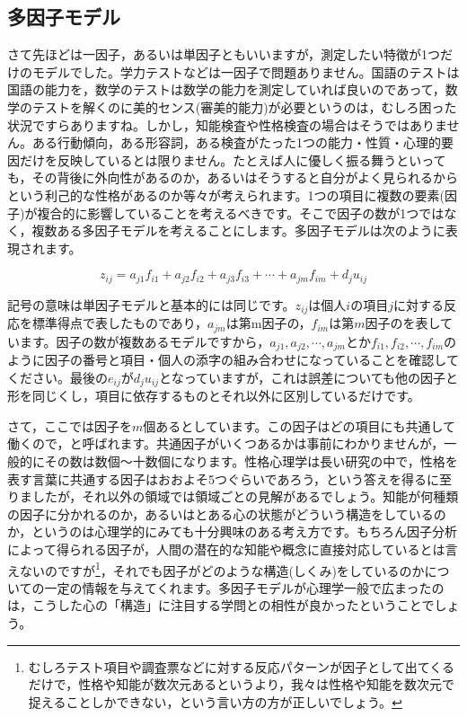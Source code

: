 \documentclass{ltjsbook}
\begin{document}
\subsection{多因子モデル}
さて先ほどは一因子，あるいは単因子ともいいますが，測定したい特徴が1つだけのモデルでした。学力テストなどは一因子で問題ありません。国語のテストは国語の能力を，数学のテストは数学の能力を測定していれば良いのであって，数学のテストを解くのに美的センス(審美的能力)が必要というのは，むしろ困った状況ですらありますね。しかし，知能検査や性格検査の場合はそうではありません。ある行動傾向，ある形容詞，ある検査がたった1つの能力・性質・心理的要因だけを反映しているとは限りません。たとえば人に優しく振る舞うといっても，その背後に外向性があるのか，あるいはそうすると自分がよく見られるからという利己的な性格があるのか等々が考えられます。1つの項目に複数の要素(因子)が複合的に影響していることを考えるべきです。そこで因子の数が1つではなく，複数ある多因子モデルを考えることにします。多因子モデルは次のように表現されます。

\begin{equation}
	z_{ij} = a_{j1}f_{i1} + a_{j2}f_{i2}+a_{j3}f_{i3} + \cdots + a_{jm}f_{im} + d_j u_{ij}
	\label{factor}
\end{equation}

記号の意味は単因子モデルと基本的には同じです。$z_{ij}$は個人$i$の項目$j$に対する反応を標準得点で表したものであり，$a_{jm}$は第m因子の，$f_{im}$は第$m$因子のを表しています。因子の数が複数あるモデルですから，$a_{j1},a_{j2},\cdots, a_{jm}$とか$f_{i1},f_{i2},\cdots, f_{im}$のように因子の番号と項目・個人の添字の組み合わせになっていることを確認してください。最後の$e_{ij}$が$d_j u_{ij}$となっていますが，これは誤差についても他の因子と形を同じくし，項目に依存するものとそれ以外に区別しているだけです。

さて，ここでは因子を$m$個あるとしています。この因子はどの項目にも共通して働くので，と呼ばれます。共通因子がいくつあるかは事前にわかりませんが，一般的にその数は数個〜十数個になります。性格心理学は長い研究の中で，性格を表す言葉に共通する因子はおおよそ5つぐらいであろう，という答えを得るに至りましたが，それ以外の領域では領域ごとの見解があるでしょう。知能が何種類の因子に分かれるのか，あるいはとある心の状態がどういう構造をしているのか，というのは心理学的にみても十分興味のある考え方です。もちろん因子分析によって得られる因子が，人間の潜在的な知能や概念に直接対応しているとは言えないのですが\footnote{むしろテスト項目や調査票などに対する反応パターンが因子として出てくるだけで，性格や知能が数次元あるというより，我々は性格や知能を数次元で捉えることしかできない，という言い方の方が正しいでしょう。}，それでも因子がどのような構造(しくみ)をしているのかについての一定の情報を与えてくれます。多因子モデルが心理学一般で広まったのは，こうした心の「構造」に注目する学問との相性が良かったということでしょう。
\end{document}
